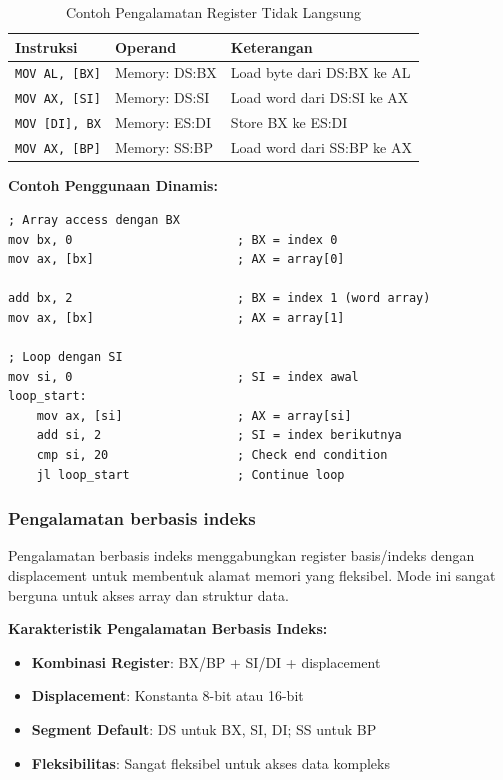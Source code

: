 \documentclass[../main.tex]{subfiles}
\begin{document}
\begin{table}[h]
\centering
\caption{Contoh Pengalamatan Register Tidak Langsung}
\begin{tabular}{|p{4cm}|p{4cm}|p{7cm}|}
\hline
\textbf{Instruksi} & \textbf{Operand} & \textbf{Keterangan} \\
\hline
\texttt{MOV AL, [BX]} & Memory: DS:BX & Load byte dari DS:BX ke AL \\
\hline
\texttt{MOV AX, [SI]} & Memory: DS:SI & Load word dari DS:SI ke AX \\
\hline
\texttt{MOV [DI], BX} & Memory: ES:DI & Store BX ke ES:DI \\
\hline
\texttt{MOV AX, [BP]} & Memory: SS:BP & Load word dari SS:BP ke AX \\
\hline
\end{tabular}
\label{tab:indirect-register-addressing-examples}
\end{table}

\textbf{Contoh Penggunaan Dinamis:}
\begin{lstlisting}[language={[x86masm]Assembler}, caption=Penggunaan Dinamis Register untuk Array Access, label=lst:dynamic-usage]
; Array access dengan BX
mov bx, 0                       ; BX = index 0
mov ax, [bx]                    ; AX = array[0]

add bx, 2                       ; BX = index 1 (word array)
mov ax, [bx]                    ; AX = array[1]

; Loop dengan SI
mov si, 0                       ; SI = index awal
loop_start:
    mov ax, [si]                ; AX = array[si]
    add si, 2                   ; SI = index berikutnya
    cmp si, 20                  ; Check end condition
    jl loop_start               ; Continue loop
\end{lstlisting}

\subsubsection{Pengalamatan berbasis indeks}
Pengalamatan berbasis indeks menggabungkan register basis/indeks dengan displacement untuk membentuk alamat memori yang fleksibel. Mode ini sangat berguna untuk akses array dan struktur data.

\textbf{Karakteristik Pengalamatan Berbasis Indeks:}
\begin{itemize}
    \item \textbf{Kombinasi Register}: BX/BP + SI/DI + displacement
    \item \textbf{Displacement}: Konstanta 8-bit atau 16-bit
    \item \textbf{Segment Default}: DS untuk BX, SI, DI; SS untuk BP
    \item \textbf{Fleksibilitas}: Sangat fleksibel untuk akses data kompleks
\end{itemize}
\end{document}
